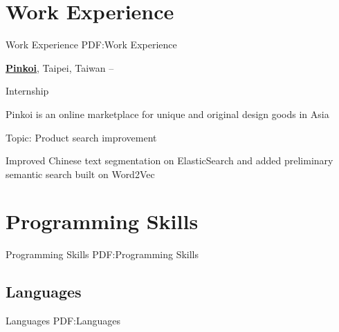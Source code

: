 \documentclass[a4paper,12pt,oneside]{article}
\begin{document}
\begin{body}

%


\section{Work Experience}
{Work Experience}
{PDF:Work Experience}

\href{http://pinkoi.com}
{\textbf{Pinkoi}},
Taipei, Taiwan
\hfill
{} --
\par
Internship
\begin{detail}
    \begin{detailitem}
    \item Pinkoi is an online marketplace for unique and original design goods in Asia
    \item Topic: Product search improvement
    \item Improved Chinese text segmentation on ElasticSearch and added
        preliminary semantic search built on Word2Vec
    \end{detailitem}
\end{detail}



\section{Programming Skills}
{Programming Skills}
{PDF:Programming Skills}

\subsection{Languages}
{Languages}
{PDF:Languages}


\end{body}
\end{document}

